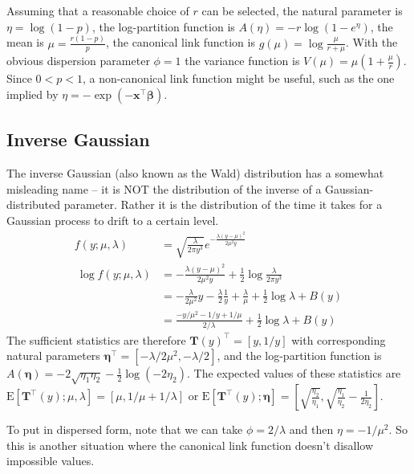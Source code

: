 \documentclass{article}
\newcommand{\bbeta}{\boldsymbol{\beta}}
\begin{document}
Assuming that a reasonable choice of \(r\) can be selected, the natural
parameter is \(\eta = \log(1-p)\), the log-partition function is \(A(\eta)
= - r \log(1 - e^\eta)\), the mean is \(\mu = \frac{r(1-p)}{p}\), the canonical
link function is \(g(\mu) = \log \frac{\mu}{r+\mu}\).
With the obvious dispersion parameter \(\phi = 1\) the variance function is
\(V(\mu) = \mu \left( 1 + \frac{\mu}{r} \right)\).
Since \(0 < p < 1\), a non-canonical link function might be useful, such as
the one implied by
\(\eta = - \exp(-\mathbf{x}^\intercal \bbeta)\).


\subsection{Inverse Gaussian}

The inverse Gaussian (also known as the Wald) distribution has a somewhat
misleading name -- it is NOT the distribution of the inverse of a
Gaussian-distributed parameter.
Rather it is the distribution of the time it takes for a Gaussian process to
drift to a certain level.
\begin{align}
f(y; \mu, \lambda) &= \sqrt{\frac{\lambda}{2\pi y^3}}
e^{-\frac{\lambda(y-\mu)^2}{2\mu^2 y}} \\\
\log f(y; \mu, \lambda) &= -\frac{\lambda(y - \mu)^2}{2\mu^2 y} + \frac{1}{2}
\log \frac{\lambda}{2\pi y^3} \\\
&= -\frac{\lambda}{2\mu^2} y - \frac{\lambda}{2} \frac{1}{y} +
\frac{\lambda}{\mu} + \frac{1}{2}\log \lambda + B(y) \\
&= \frac{-y/\mu^2 - 1/y + 1/\mu}{2/\lambda} + \frac{1}{2}\log\lambda + B(y)
\end{align}
The sufficient statistics are therefore \(\mathbf{T}(y)^\intercal = [y, 1/y]\)
with corresponding natural parameters \(\boldsymbol{\eta}^\intercal =
[-\lambda/2\mu^2, -\lambda/2]\), and the log-partition function is
\(A(\boldsymbol{\eta}) = - 2\sqrt{\eta_1 \eta_2} - \frac{1}{2} \log (-2\eta_2) \).
The expected values of these statistics are \(\textrm{E}[\mathbf{T}^\intercal(y); \mu,
\lambda] = [\mu, 1/\mu + 1/\lambda] \) or \(\textrm{E}[\mathbf{T}^\intercal
(y); \boldsymbol{\eta}] = \left[\sqrt{\frac{\eta_2}{\eta_1}},
\sqrt{\frac{\eta_1}{\eta_2}} - \frac{1}{2\eta_2}\right]\).

To put in dispersed form, note that we can take \(\phi = 2/\lambda\) and then
\(\eta = -1/\mu^2\). So this is another situation where the canonical link
function doesn't disallow impossible values.
\end{document}
